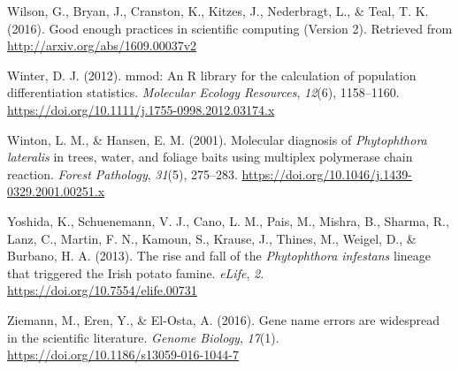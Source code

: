 \documentclass[double,11pt]{beavtex}
\begin{document}
  \hypertarget{ref-wilson2016good}{}
  Wilson, G., Bryan, J., Cranston, K., Kitzes, J., Nederbragt, L., \&
  Teal, T. K. (2016). Good enough practices in scientific computing
  (Version 2). Retrieved from \url{http://arxiv.org/abs/1609.00037v2}
  
  \hypertarget{ref-winter2012mmod}{}
  Winter, D. J. (2012). mmod: An R library for the calculation of
  population differentiation statistics. \emph{Molecular Ecology
  Resources}, \emph{12}(6), 1158--1160.
  \url{https://doi.org/10.1111/j.1755-0998.2012.03174.x}
  
  \hypertarget{ref-winton2001molecular}{}
  Winton, L. M., \& Hansen, E. M. (2001). Molecular diagnosis of
  \emph{Phytophthora lateralis} in trees, water, and foliage baits using
  multiplex polymerase chain reaction. \emph{Forest Pathology},
  \emph{31}(5), 275--283.
  \url{https://doi.org/10.1046/j.1439-0329.2001.00251.x}
  
  \hypertarget{ref-yoshida2013rise}{}
  Yoshida, K., Schuenemann, V. J., Cano, L. M., Pais, M., Mishra, B.,
  Sharma, R., Lanz, C., Martin, F. N., Kamoun, S., Krause, J., Thines, M.,
  Weigel, D., \& Burbano, H. A. (2013). The rise and fall of the
  \emph{Phytophthora infestans} lineage that triggered the Irish potato
  famine. \emph{eLife}, \emph{2}.
  \url{https://doi.org/10.7554/elife.00731}
  
  \hypertarget{ref-ziemann2016gene}{}
  Ziemann, M., Eren, Y., \& El-Osta, A. (2016). Gene name errors are
  widespread in the scientific literature. \emph{Genome Biology},
  \emph{17}(1). \url{https://doi.org/10.1186/s13059-016-1044-7}
\end{document}
